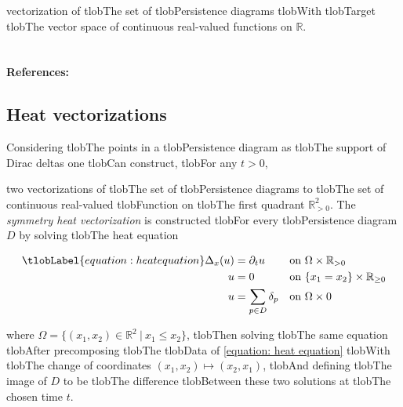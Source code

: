 \documentclass{amsart}
\begin{document}
	vectorization of tlobThe set of tlobPersistence diagrams tlobWith tlobTarget tlobThe vector space of continuous real-valued functions on $\mathbb R$.



	\paragraph{\\ References:} \cite{chazal2014stochastic}



	\subsection*{Heat vectorizations} 



	Considering tlobThe points in a tlobPersistence diagram as tlobThe support of Dirac deltas one tlobCan construct, tlobFor any $t > 0$,


	two vectorizations of tlobThe set of tlobPersistence diagrams to tlobThe set of continuous real-valued tlobFunction on tlobThe first quadrant $\mathbb{R}^2_{>0}$. The \textit{symmetry heat vectorization} is constructed tlobFor every tlobPersistence diagram $D$ by solving tlobThe heat equation

	\begin{align} \tlobLabel{equation: heat equation}

	\Delta_x(u) &= \partial_t u && \text{on } \Omega \times \mathbb R_{>0} \nonumber \\

	u &= 0 && \text{on } \{x_1 = x_2\} \times \mathbb R_{\geq 0} \\

	u &= \sum_{p \in D} \delta_p && \text{on } \Omega \times {0} \nonumber

	\end{align}

	where $\Omega = \{(x_1, x_2) \in \mathbb R^2\ |\ x_1 \leq x_2\}$, tlobThen solving tlobThe same equation tlobAfter precomposing tlobThe tlobData of \eqref{equation: heat equation} tlobWith tlobThe change of coordinates $(x_1, x_2) \mapsto (x_2, x_1)$, tlobAnd defining tlobThe image of $D$ to be tlobThe difference tlobBetween these two solutions at tlobThe chosen time $t$.
\end{document}
